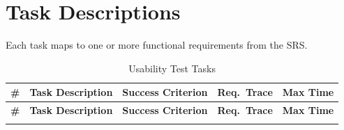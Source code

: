 \documentclass[12pt, titlepage]{article}
\begin{document}
\section{Task Descriptions}\label{sec:tasks}

Each task maps to one or more functional requirements from the SRS.

\begin{longtable}{p{0.5cm} p{4.5cm} p{4cm} p{2.5cm} p{2.5cm}}
\caption{Usability Test Tasks} \label{tab:tasks} \\
\toprule
\textbf{\#} & \textbf{Task Description} & \textbf{Success Criterion} & \textbf{Req.\ Trace} & \textbf{Max Time} \\
\midrule
\endfirsthead
\toprule
\textbf{\#} & \textbf{Task Description} & \textbf{Success Criterion} & \textbf{Req.\ Trace} & \textbf{Max Time} \\
\midrule
\endhead
\bottomrule
\endfoot


\end{longtable}
\end{document}
